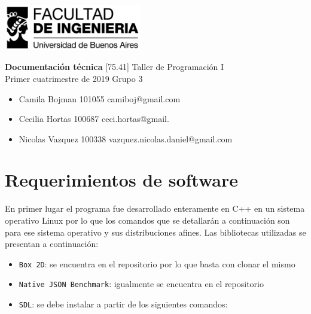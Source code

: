 \documentclass[a4paper]{article}
\newcommand{\materia}{[75.41] Taller de Programación I}
\newcommand{\trabajo}{Documentación técnica}
\newcommand{\cuatrimestre}{Primer cuatrimestre de 2019}
\newcommand{\grupo}{Grupo 3}
\begin{document}
	\setcounter{page}{1}
	
	\begin{titlepage}
		\hfill\includegraphics[width=6cm]{fiuba.jpeg}
		\begin{center}
			\vfill
			\Huge \textbf{\trabajo}
			\vskip2cm
			\Large \materia\\
			\cuatrimestre
			\vfill
			\grupo
			\begin{itemize}
				\item Camila Bojman 101055 camiboj@gmail.com
				\item Cecilia Hortas 100687 ceci.hortas@gmail.
				\item Nicolas Vazquez 100338 vazquez.nicolas.daniel@gmail.com
			\end{itemize}
			\vskip1cm
		\end{center}
	\end{titlepage}

\section{Requerimientos de software}

En primer lugar el programa fue desarrollado enteramente en C++ en un sistema operativo Linux por lo que los comandos que se detallarán a continuación son para ese sistema operativo y sus distribuciones afines. Las bibliotecas utilizadas se presentan a continuación:

\begin{itemize}
	\item \texttt{Box 2D}: se encuentra en el repositorio por lo que basta con clonar el mismo
\end{itemize}

\begin{itemize}
	\item \texttt{Native JSON Benchmark}: igualmente se encuentra en el repositorio
\end{itemize}

\begin{itemize}
	\item \texttt{SDL}: se debe instalar a partir de los siguientes comandos:
\end{itemize}
\end{document}
